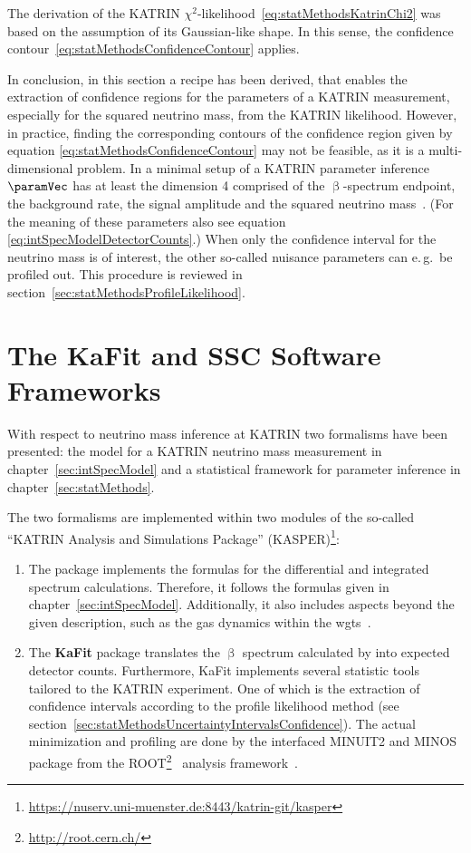 The derivation of the KATRIN $\chi^2$-likelihood~\eqref{eq:statMethodsKatrinChi2} was based on the assumption of its Gaussian-like shape. In this sense, the confidence contour~\eqref{eq:statMethodsConfidenceContour} applies. 

In conclusion, in this section a recipe has been derived, that enables the extraction of confidence regions for the parameters of a KATRIN measurement, especially for the squared neutrino mass, from the KATRIN likelihood. However, in practice, finding the corresponding contours of the confidence region given by equation \ref{eq:statMethodsConfidenceContour} may not be feasible, as it is a multi-dimensional problem. In a minimal setup of a KATRIN parameter inference $\paramVec$ has at least the dimension 4 comprised of the $\upbeta$-spectrum endpoint, the background rate, the signal amplitude and the squared neutrino mass~\cite{Kleesiek2014}. (For the meaning of these parameters also see equation \eqref{eq:intSpecModelDetectorCounts}.) When only the confidence interval for the neutrino mass is of interest, the other so-called nuisance parameters can e.\,g.~be profiled out. This procedure is reviewed in section~\ref{sec:statMethodsProfileLikelihood}.

\section{The KaFit and SSC Software Frameworks}
\label{sec:statMethodsKaFitSSC}
With respect to neutrino mass inference at KATRIN two formalisms have been presented: the model for a KATRIN neutrino mass measurement in chapter~\ref{sec:intSpecModel} and a statistical framework for parameter inference in chapter~\ref{sec:statMethods}. 

The two formalisms are implemented within two modules of the so-called ``KATRIN Analysis and Simulations Package'' (KASPER)\footnote{\url{https://nuserv.uni-muenster.de:8443/katrin-git/kasper}}:
\begin{enumerate}
	\item The \textbf{} package implements the formulas for the differential and integrated spectrum calculations. Therefore, it follows the formulas given in chapter~\ref{sec:intSpecModel}. Additionally, it also includes aspects beyond the given description, such as the gas dynamics within the \gls{wgts}~\cite{Hoetzel2012, Groh2015, Kleesiek2019, Kaefer2012}.
	\item The \textbf{KaFit} package translates the $\upbeta$ spectrum calculated by  into expected detector counts. Furthermore, KaFit implements several statistic tools tailored to the KATRIN experiment. One of which is the extraction of confidence intervals according to the profile likelihood method (see section~\ref{sec:statMethodsUncertaintyIntervalsConfidence}). The actual minimization and profiling are done by the interfaced MINUIT2 and MINOS package from the ROOT\footnote{\url{http://root.cern.ch/}}~\cite{ANTCHEVA2009} analysis framework~\cite{Kleesiek2014}.
\end{enumerate}

